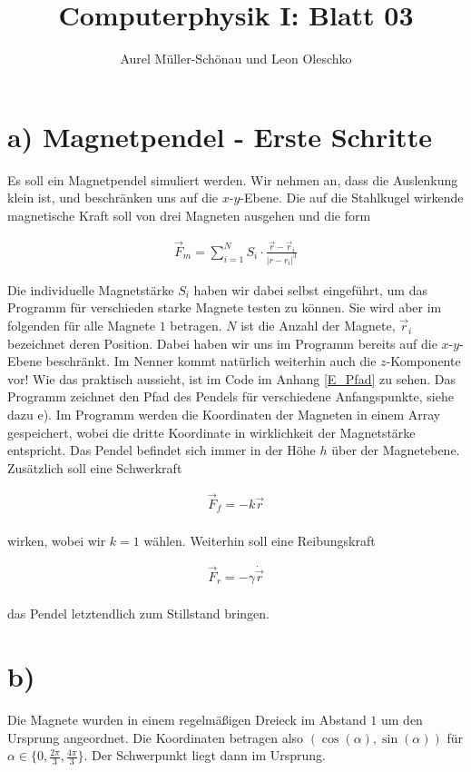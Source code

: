 





\title{Computerphysik I: Blatt 03}
\author{Aurel Müller-Schönau und Leon Oleschko}
\maketitle


\section*{a) Magnetpendel - Erste Schritte}
Es soll ein Magnetpendel simuliert werden. Wir nehmen an, dass die Auslenkung klein ist, und beschränken uns auf die $x$-$y$-Ebene. Die auf die Stahlkugel wirkende magnetische Kraft soll von drei Magneten ausgehen und die form

\begin{align}
\vec{F}_m = \sum_{i=1}^N S_i \cdot \frac{\vec{r} - \vec{r}_i}{|r - r_i|^3}
\end{align}

Die individuelle Magnetstärke $S_i$ haben wir dabei selbst eingeführt, um das Programm für verschieden starke Magnete testen zu können. Sie wird aber im folgenden für alle Magnete $1$ betragen. $N$ ist die Anzahl der Magnete, $\vec{r}_i$ bezeichnet deren Position. Dabei haben wir uns im Programm bereits auf die $x$-$y$-Ebene beschränkt. Im Nenner kommt natürlich weiterhin auch die $z$-Komponente vor! Wie das praktisch aussieht, ist im Code im Anhang \ref{E_Pfad} zu sehen. Das Programm zeichnet den Pfad des Pendels für verschiedene Anfangspunkte, siehe dazu e). Im Programm werden die Koordinaten der Magneten in einem Array gespeichert, wobei die dritte Koordinate in wirklichkeit der Magnetstärke entspricht. Das Pendel befindet sich immer in der Höhe $h$ über der Magnetebene.\\
Zusätzlich soll eine Schwerkraft 

\begin{align}
\vec{F}_f = -k \vec{r}
\end{align}
\\
wirken, wobei wir $k=1$ wählen. Weiterhin soll eine Reibungskraft

\begin{align}
\vec{F}_r = -\gamma \dot{\vec{r}}
\end{align}
\\
das Pendel letztendlich zum Stillstand bringen.

\section*{b)}
Die Magnete wurden in einem regelmäßigen Dreieck im Abstand $1$ um den Ursprung angeordnet. Die Koordinaten betragen also $\left(\cos(\alpha), \sin(\alpha)\right)$ für $\alpha \in \{0, \frac{2\pi}{3}, \frac{4\pi}{3}\}$. Der Schwerpunkt liegt dann im Ursprung.

